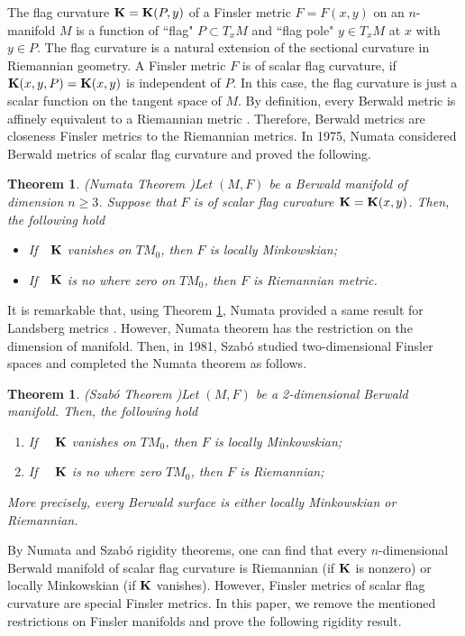\documentclass[12pt,a4paper]{article}
\newcounter{alphthm}
\newtheorem{propriete}[alphthm]{Theorem}
\theoremstyle{definition}
\numberwithin{equation}{section}
\begin{document}
The flag curvature ${\bf K} = {\bf K}(P, y)$ of a Finsler metric $F = F(x, y)$ on an $n$-manifold $M$ is a function of ``flag" $P\subset T_xM$
and ``flag pole" $ y\in T_xM$ at $x$ with $y\in P$. The flag curvature is a natural extension of the sectional curvature in Riemannian geometry. A Finsler metric $F$ is of scalar flag curvature, if ${\bf K}(x, y, P)={\bf K}(x, y)$ is independent of $ P$. In this case, the flag curvature is just a scalar function on the tangent space of $M$. By definition, every Berwald  metric is affinely equivalent to a Riemannian metric \cite{ShDiff}. Therefore, Berwald metrics are closeness  Finsler metrics to the Riemannian metrics.  In 1975, Numata considered Berwald metrics of scalar flag curvature and proved the following.
\begin{propriete}{\rm (Numata Theorem \cite{Num})}\label{Num}
Let $(M, F)$ be a Berwald manifold of dimension $n\geq3$.   Suppose that $F$ is of scalar
flag curvature ${\bf K}={\bf K}(x, y)$. Then, the following hold
\begin{itemize}
\item[1.] If\ \ ${\bf K}$ vanishes on $TM_0$, then $F$ is locally Minkowskian;
\item[2.] If\ \ ${\bf K}$ is no where zero on $TM_0$, then $F$ is Riemannian metric.
\end{itemize}
\end{propriete}
It is remarkable that, using Theorem \ref{Num}, Numata  provided a same result for Landsberg metrics \cite{Num}. However, Numata theorem has the restriction on the dimension of manifold. Then, in 1981, Szab\'{o} studied two-dimensional Finsler spaces and completed the Numata theorem as follows.
\begin{propriete}{\rm (Szab\'{o}  Theorem \cite{Szabo1})}\label{Szabo}
Let $(M, F)$ be a  2-dimensional Berwald  manifold. Then, the following hold
\begin{enumerate}
  \item If \ \ ${\bf K}$ vanishes on $TM_0$, then $F$ is locally Minkowskian;
  \item If \ \ ${\bf K}$ is no where zero $TM_0$, then $F$ is Riemannian;
  \end{enumerate}
More precisely, every  Berwald surface is either locally Minkowskian  or Riemannian.
\end{propriete}
By Numata and  Szab\'{o} rigidity theorems, one can find that every $n$-dimensional Berwald manifold of scalar flag curvature is Riemannian (if ${\bf K}$ is nonzero) or locally Minkowskian (if ${\bf K}$ vanishes). However, Finsler metrics of scalar flag curvature  are special Finsler metrics.  In this paper, we remove the mentioned restrictions on Finsler manifolds and prove the following rigidity result.
\end{document}
